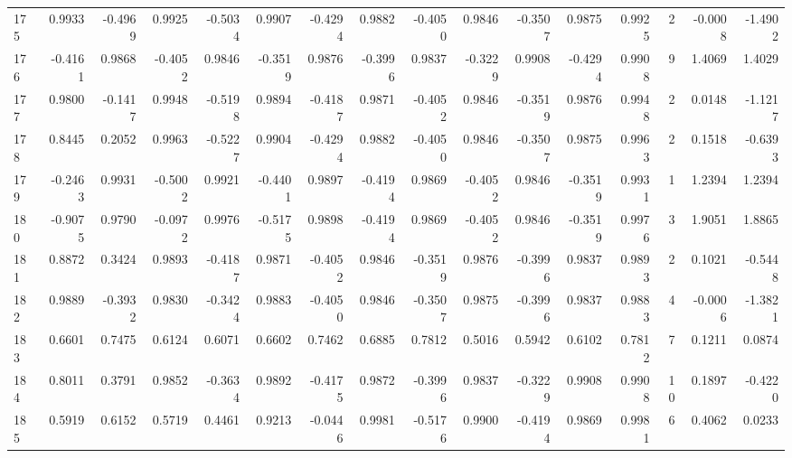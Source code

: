 \begin{tabular}{lrrrrrrrrrrrrrrr}
175 &      0.9933 & -0.4969 &  0.9925 & -0.5034 &  0.9907 & -0.4294 &  0.9882 & -0.4050 &  0.9846 & -0.3507 &   0.9875 &     0.9925 &      2 &                   -0.0008 &                    -1.4902 \\
176 &     -0.4161 &  0.9868 & -0.4052 &  0.9846 & -0.3519 &  0.9876 & -0.3996 &  0.9837 & -0.3229 &  0.9908 &  -0.4294 &     0.9908 &      9 &                    1.4069 &                     1.4029 \\
177 &      0.9800 & -0.1417 &  0.9948 & -0.5198 &  0.9894 & -0.4187 &  0.9871 & -0.4052 &  0.9846 & -0.3519 &   0.9876 &     0.9948 &      2 &                    0.0148 &                    -1.1217 \\
178 &      0.8445 &  0.2052 &  0.9963 & -0.5227 &  0.9904 & -0.4294 &  0.9882 & -0.4050 &  0.9846 & -0.3507 &   0.9875 &     0.9963 &      2 &                    0.1518 &                    -0.6393 \\
179 &     -0.2463 &  0.9931 & -0.5002 &  0.9921 & -0.4401 &  0.9897 & -0.4194 &  0.9869 & -0.4052 &  0.9846 &  -0.3519 &     0.9931 &      1 &                    1.2394 &                     1.2394 \\
180 &     -0.9075 &  0.9790 & -0.0972 &  0.9976 & -0.5175 &  0.9898 & -0.4194 &  0.9869 & -0.4052 &  0.9846 &  -0.3519 &     0.9976 &      3 &                    1.9051 &                     1.8865 \\
181 &      0.8872 &  0.3424 &  0.9893 & -0.4187 &  0.9871 & -0.4052 &  0.9846 & -0.3519 &  0.9876 & -0.3996 &   0.9837 &     0.9893 &      2 &                    0.1021 &                    -0.5448 \\
182 &      0.9889 & -0.3932 &  0.9830 & -0.3424 &  0.9883 & -0.4050 &  0.9846 & -0.3507 &  0.9875 & -0.3996 &   0.9837 &     0.9883 &      4 &                   -0.0006 &                    -1.3821 \\
183 &      0.6601 &  0.7475 &  0.6124 &  0.6071 &  0.6602 &  0.7462 &  0.6885 &  0.7812 &  0.5016 &  0.5942 &   0.6102 &     0.7812 &      7 &                    0.1211 &                     0.0874 \\
184 &      0.8011 &  0.3791 &  0.9852 & -0.3634 &  0.9892 & -0.4175 &  0.9872 & -0.3996 &  0.9837 & -0.3229 &   0.9908 &     0.9908 &     10 &                    0.1897 &                    -0.4220 \\
185 &      0.5919 &  0.6152 &  0.5719 &  0.4461 &  0.9213 & -0.0446 &  0.9981 & -0.5176 &  0.9900 & -0.4194 &   0.9869 &     0.9981 &      6 &                    0.4062 &                     0.0233 \\

\end{tabular}
